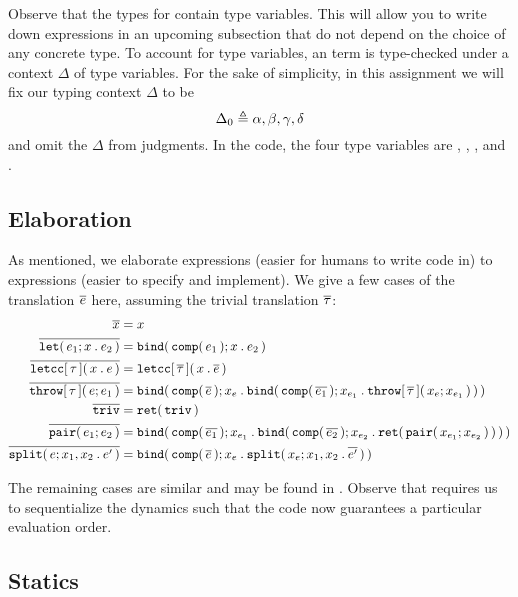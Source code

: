 \documentclass[11pt]{article}
\begin{document}
Observe that the types for \LangKPCFv{} contain type variables.
This will allow you to write down expressions in an upcoming subsection that do not depend on the choice of any concrete type.
To account for type variables, an \LangKPCFv{} term is type-checked under a context $\Delta$ of type variables.
For the sake of simplicity, in this assignment we will fix our typing context $\Delta$ to be
$$\Delta_0 \isdef{} \alpha, \beta, \gamma, \delta$$
and omit the $\Delta$ from judgments.
In the code, the four type variables are , , , and .

\subsection{Elaboration}

As mentioned, we elaborate \LangKPCF{} expressions (easier for humans to write code in) to \LangKPCFv{} expressions (easier to specify and implement).
We give a few cases of the translation $\Elaborate{e}$ here, assuming the trivial translation $\Elaborate{\tau}$:
\begin{align*}
  \Elaborate{x} &= x \\
  \Elaborate{\letbeabt{e_1}{x}{e_2}} &= \bindabt{\compabt{e_1}}{x}{e_2} \\
  \Elaborate{\letccabt{\tau}{x}{e}} &= \letccabt{\Elaborate{\tau}}{x}{\Elaborate{e}} \\
  \Elaborate{\throwabt{\tau}{e}{e_1}} &= \bindabt{\compabt{\Elaborate{e}}}{x_e}{\bindabt{\compabt{\Elaborate{e_1}}}{x_{e_1}}{\throwabt{\Elaborate{\tau}}{x_e}{x_{e_1}}}} \\
  \Elaborate{\unitexabt} &= \retabt{\unitexabt} \\
  \Elaborate{\pairexabt{e_1}{e_2}} &= \bindabt{\compabt{\Elaborate{e_1}}}{x_{e_1}}{\bindabt{\compabt{\Elaborate{e_2}}}{x_{e_2}}{\retabt{\pairexabt{x_{e_1}}{x_{e_2}}}}} \\
  \Elaborate{\splitexabt{e}{x_1}{x_2}{e'}} &= \bindabt{\compabt{\Elaborate{e}}}{x_e}{\splitexabt{x_e}{x_1}{x_2}{\Elaborate{e'}}}
\end{align*}

The remaining cases are similar and may be found in .
Observe that \LangKPCFv{} requires us to sequentialize the dynamics such that the code now guarantees a particular evaluation order.

\subsection{Statics}
\end{document}
